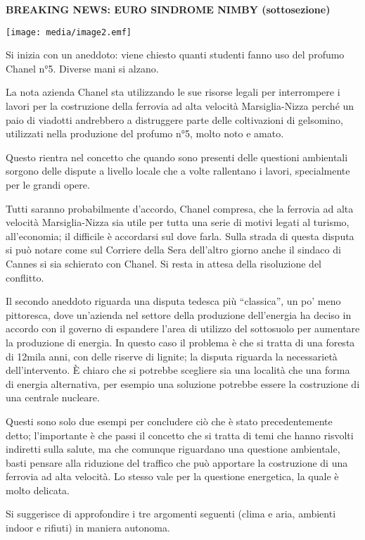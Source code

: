 \documentclass[]{article}
\date{}
\begin{document}
\textbf{BREAKING NEWS: EURO SINDROME NIMBY (sottosezione)}

\texttt{[image: media/image2.emf]}

Si inizia con un aneddoto: viene chiesto quanti studenti fanno uso del
profumo Chanel n°5. Diverse mani si alzano.

La nota azienda Chanel sta utilizzando le sue risorse legali per
interrompere i lavori per la costruzione della ferrovia ad alta velocità
Marsiglia-Nizza perché un paio di viadotti andrebbero a distruggere
parte delle coltivazioni di gelsomino, utilizzati nella produzione del
profumo n°5, molto noto e amato.

Questo rientra nel concetto che quando sono presenti delle questioni
ambientali sorgono delle dispute a livello locale che a volte rallentano
i lavori, specialmente per le grandi opere.

Tutti saranno probabilmente d'accordo, Chanel compresa, che la ferrovia
ad alta velocità Marsiglia-Nizza sia utile per tutta una serie di motivi
legati al turismo, all'economia; il difficile è accordarsi sul dove
farla. Sulla strada di questa disputa si può notare come sul Corriere
della Sera dell'altro giorno anche il sindaco di Cannes si sia schierato
con Chanel. Si resta in attesa della risoluzione del conflitto.

Il secondo aneddoto riguarda una disputa tedesca più ``classica'', un
po' meno pittoresca, dove un'azienda nel settore della produzione
dell'energia ha deciso in accordo con il governo di espandere l'area di
utilizzo del sottosuolo per aumentare la produzione di energia. In
questo caso il problema è che si tratta di una foresta di 12mila anni,
con delle riserve di lignite; la disputa riguarda la necessarietà
dell'intervento. È chiaro che si potrebbe scegliere sia una località che
una forma di energia alternativa, per esempio una soluzione potrebbe
essere la costruzione di una centrale nucleare.

Questi sono solo due esempi per concludere ciò che è stato
precedentemente detto; l'importante è che passi il concetto che si
tratta di temi che hanno risvolti indiretti sulla salute, ma che
comunque riguardano una questione ambientale, basti pensare alla
riduzione del traffico che può apportare la costruzione di una ferrovia
ad alta velocità. Lo stesso vale per la questione energetica, la quale è
molto delicata.

Si suggerisce di approfondire i tre argomenti seguenti (clima e aria,
ambienti indoor e rifiuti) in maniera autonoma.
\end{document}
